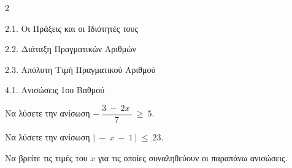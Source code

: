 \begin{ylh}{2}
    \item 2.1. Οι Πράξεις και οι Ιδιότητές τους
    \item 2.2. Διάταξη Πραγματικών Αριθμών
    \item 2.3. Απόλυτη Τιμή Πραγματικού Αριθμού
    \item 4.1. Ανισώσεις 1ου Βαθμού
\end{ylh}
\begin{alist}
\item Να λύσετε την ανίσωση $- \ \dfrac{3\  - \ 2x\ }{7}\  \geq \ 5.$
\item Να λύσετε την ανίσωση $|\  - \ x\  - \ 1\ |\  \leq \ 23.$
\item Να βρείτε τις τιμές του $x$ για τις οποίες συναληθεύουν οι παραπάνω ανισώσεις.

\end{alist}

